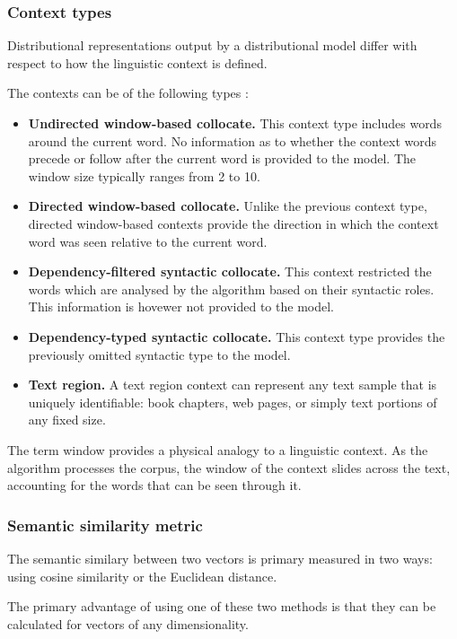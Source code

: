 \documentclass[14pt, a4paper]{extreport}
\begin{document}
\subsubsection{Context types}

Distributional representations output by a distributional model differ with respect to how the linguistic context is defined.

The contexts can be of the following types \parencite{lenci}:

\begin{itemize}
  \item \textbf{Undirected window-based collocate.} This context type includes words around the current word. No information as to whether the context words precede or follow after the current word is provided to the model. The window size typically ranges from 2 to 10.
  \item \textbf{Directed window-based collocate.} Unlike the previous context type, directed window-based contexts provide the direction in which the context word was seen relative to the current word.
  \item \textbf{Dependency-filtered syntactic collocate.} This context restricted the words which are analysed by the algorithm based on their syntactic roles. This information is hovewer not provided to the model.
  \item \textbf{Dependency-typed syntactic collocate.} This context type provides the previously omitted syntactic type to the model.
  \item \textbf{Text region.} A text region context can represent any text sample that is uniquely identifiable: book chapters, web pages, or simply text portions of any fixed size.
\end{itemize}

The term window provides a physical analogy to a linguistic context. As the algorithm processes the corpus, the window of the context slides across the text, accounting for the words that can be seen through it.


\subsubsection{Semantic similarity metric}
The semantic similary between two vectors is primary measured in two ways: using cosine similarity or the Euclidean distance.

The primary advantage of using one of these two methods is that they can be calculated for vectors of any dimensionality.
\end{document}
